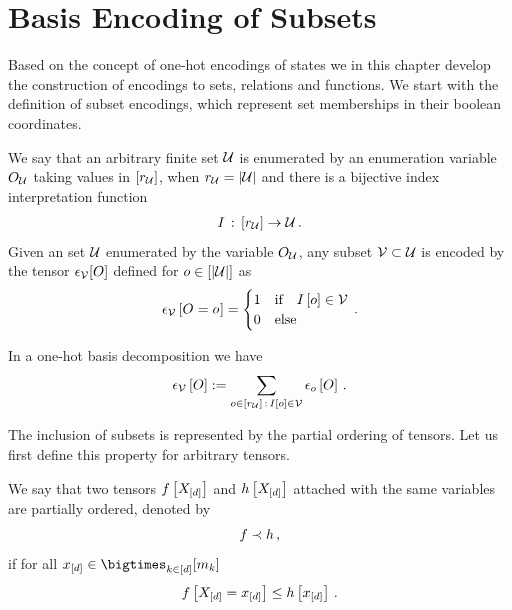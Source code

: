 \section{Basis Encoding of Subsets}

Based on the concept of one-hot encodings of states we in this chapter develop the construction of encodings to sets, relations and functions.
We start with the definition of subset encodings, which represent set memberships in their boolean coordinates.

\begin{definition}
    \label{def:subsetEncoding}
    We say that an arbitrary finite set $\mathcal{U}$ is enumerated by an enumeration variable $O_{\mathcal{U}}$ taking values in $[r_{\mathcal{U}}]$, when $r_{\mathcal{U}}=\left|\mathcal{U}\right|$ and there is a bijective index interpretation function
    \begin{align*}
        I \,:\, [r_{\mathcal{U}}] \rightarrow \mathcal{U} \, .
    \end{align*}
    Given an set $\mathcal{U}$ enumerated by the variable $O_{\mathcal{U}}$, any subset $\mathcal{V}\subset\mathcal{U}$ is encoded by the tensor $\epsilon_{\mathcal{V}}[O]$ defined for $o\in[\left|\mathcal{U}\right|]$ as
    \begin{align*}
        \epsilon_{\mathcal{V}}\left[O_{}=o_{}\right]
        = \begin{cases}
              1 & \text{if}\quad I\left[o\right] \in \mathcal{V} \\
              0 & \text{else}
        \end{cases} \, .
    \end{align*}
\end{definition}

In a one-hot basis decomposition we have
\begin{align*}
    \epsilon_{\mathcal{V}}\left[O\right]
    := \sum_{o\in[r_{\mathcal{U}}]\,:\,I\left[o\right]\in\mathcal{V}}\epsilon_{o}\left[O\right] \, .
\end{align*}


The inclusion of subsets is represented by the partial ordering of tensors.
Let us first define this property for arbitrary tensors.

\begin{definition}
    \label{def:partialOrder}
    We say that two tensors $f\left[X_{[d]}\right]$ and $h\left[X_{[d]}\right]$ attached with the same variables are partially ordered, denoted by
    \begin{align*}
    {f}
        \prec{h} \, ,
    \end{align*}
    if for all $\shortcatindices\in\facstates$
    \begin{align*}
        f\left[X_{[d]}=x_{[d]}\right] \leq h\left[x_{[d]}\right]  \, .
    \end{align*}
\end{definition}

